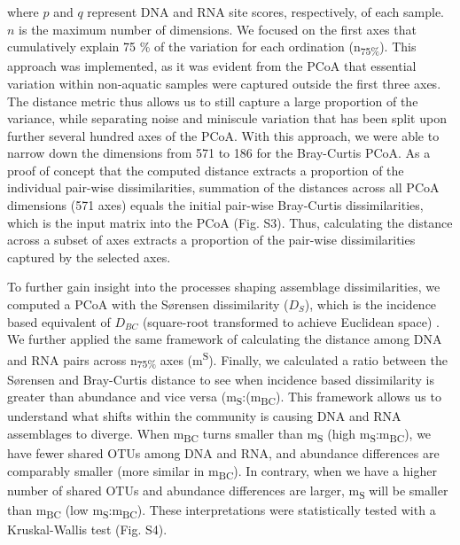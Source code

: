 \documentclass[12pt,a4paper]{article} %
\begin{document}
where $p$ and $q$ represent DNA and RNA site scores, respectively, of each sample. $n$ is the maximum number of dimensions. We focused on the first axes that cumulatively explain 75 \% of the variation for each ordination (n\textsubscript{75\%}). This approach was implemented, as it was evident from the PCoA that essential variation within non-aquatic samples were captured outside the first three axes. The distance metric thus allows us to still capture a large proportion of the variance, while separating noise and miniscule variation that has been split upon further several hundred axes of the PCoA. With this approach, we were able to narrow down the dimensions from 571 to 186 for the Bray-Curtis PCoA. As a proof of concept that the computed distance extracts a proportion of the individual pair-wise dissimilarities, summation of the distances across all PCoA dimensions (571 axes) equals the initial pair-wise Bray-Curtis dissimilarities, which is the input matrix into the PCoA (Fig. S3). Thus, calculating the distance across a subset of axes extracts a proportion of the pair-wise dissimilarities captured by the selected axes.

To further gain insight into the processes shaping assemblage dissimilarities, we computed a PCoA with the S{\o}rensen dissimilarity ($D_{S}$), which is the incidence based equivalent of $D_{BC}$ (square-root transformed to achieve Euclidean space) \citep{Sorensen1948, Legendre1998}. We further applied the same framework of calculating the distance among DNA and RNA pairs across n\textsubscript{75\%} axes (m\textsuperscript{S}). Finally, we calculated a ratio between the S{\o}rensen and Bray-Curtis distance to see when incidence based dissimilarity is greater than abundance and vice versa (m\textsubscript{S}:(m\textsubscript{BC}). This framework allows us to understand what shifts within the community is causing DNA and RNA assemblages to diverge. When m\textsubscript{BC} turns smaller than m\textsubscript{S} (high m\textsubscript{S}:m\textsubscript{BC}), we have fewer shared OTUs among DNA and RNA, and abundance differences are comparably smaller (more similar in m\textsubscript{BC}). In contrary, when we have a higher number of shared OTUs and abundance differences are larger, m\textsubscript{S} will be smaller than m\textsubscript{BC} (low m\textsubscript{S}:m\textsubscript{BC}). These interpretations were statistically tested with a Kruskal-Wallis test (Fig. S4).

\end{document}

